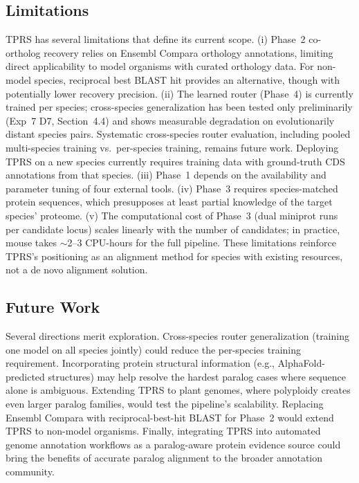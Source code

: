 \subsection{Limitations}

TPRS has several limitations that define its current scope. (i) Phase~2 co-ortholog recovery relies on Ensembl Compara orthology annotations, limiting direct applicability to model organisms with curated orthology data. For non-model species, reciprocal best BLAST hit provides an alternative, though with potentially lower recovery precision. (ii) The learned router (Phase~4) is currently trained per species; cross-species generalization has been tested only preliminarily (Exp~7 D7, Section~4.4) and shows measurable degradation on evolutionarily distant species pairs. Systematic cross-species router evaluation, including pooled multi-species training vs.\ per-species training, remains future work. Deploying TPRS on a new species currently requires training data with ground-truth CDS annotations from that species. (iii) Phase~1 depends on the availability and parameter tuning of four external tools. (iv) Phase~3 requires species-matched protein sequences, which presupposes at least partial knowledge of the target species' proteome. (v) The computational cost of Phase~3 (dual miniprot runs per candidate locus) scales linearly with the number of candidates; in practice, mouse takes $\sim$2--3 CPU-hours for the full pipeline. These limitations reinforce TPRS's positioning as an alignment method for species with existing resources, not a de novo alignment solution.

\subsection{Future Work}

Several directions merit exploration. Cross-species router generalization (training one model on all species jointly) could reduce the per-species training requirement. Incorporating protein structural information (e.g., AlphaFold-predicted structures) may help resolve the hardest paralog cases where sequence alone is ambiguous. Extending TPRS to plant genomes, where polyploidy creates even larger paralog families, would test the pipeline's scalability. Replacing Ensembl Compara with reciprocal-best-hit BLAST for Phase~2 would extend TPRS to non-model organisms. Finally, integrating TPRS into automated genome annotation workflows as a paralog-aware protein evidence source could bring the benefits of accurate paralog alignment to the broader annotation community.
